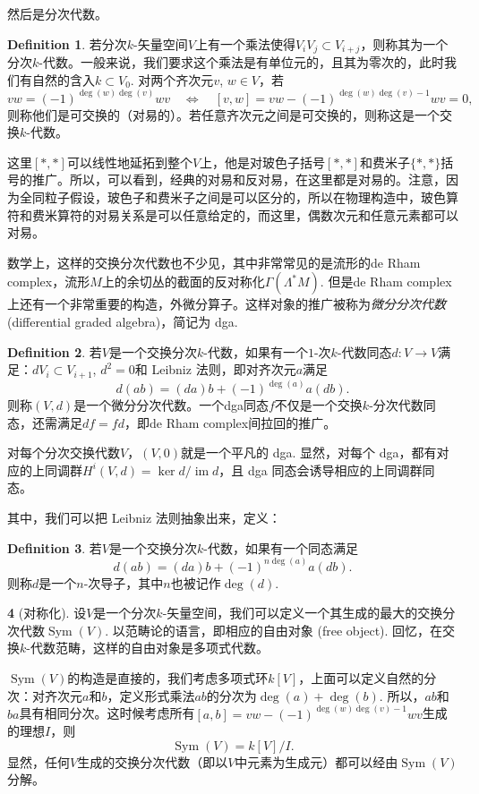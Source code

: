 \documentclass[11pt]{article}
\theoremstyle{definition}
\newtheorem{para}{}[section]
\newtheorem{defi}[para]{Definition}
\theoremstyle{plain}
\begin{document}
然后是分次代数。

\begin{defi}
    若分次$k$-矢量空间$V$上有一个乘法使得$V_iV_j\subset V_{i+j}$，则称其为一个分次$k$-代数。一般来说，我们要求这个乘法是有单位元的，且其为零次的，此时我们有自然的含入$k\subset V_0$. 对两个齐次元$v$, $w\in V$，若
\[
    vw=(-1)^{\deg(w)\deg(v)}wv\quad \Leftrightarrow \quad 
    [v,w]=vw-(-1)^{\deg(w)\deg(v)-1}wv=0,
\]
则称他们是可交换的（对易的）。若任意齐次元之间是可交换的，则称这是一个交换$k$-代数。
\end{defi}

这里$[*,*]$可以线性地延拓到整个$V$上，他是对玻色子括号$[*,*]$和费米子$\{*,*\}$括号的推广。所以，可以看到，经典的对易和反对易，在这里都是对易的。注意，因为全同粒子假设，玻色子和费米子之间是可以区分的，所以在物理构造中，玻色算符和费米算符的对易关系是可以任意给定的，而这里，偶数次元和任意元素都可以对易。

数学上，这样的交换分次代数也不少见，其中非常常见的是流形的de Rham complex，流形$M$上的余切丛的截面的反对称化$\Gamma(\Lambda^*M)$. 但是de Rham complex上还有一个非常重要的构造，外微分算子。这样对象的推广被称为\textit{微分分次代数} (differential graded algebra)，简记为 dga. 

\begin{defi}
    若$V$是一个交换分次$k$-代数，如果有一个$1$-次$k$-代数同态$d:V\to V$满足：$dV_i\subset V_{i+1}$, $d^2=0$和 Leibniz 法则，即对齐次元$a$满足
    \[
        d(ab)=(da)b+(-1)^{\deg(a)}a(db).
    \]
    则称$(V,d)$是一个微分分次代数。一个dga同态$f$不仅是一个交换$k$-分次代数同态，还需满足$df=fd$，即de Rham complex间拉回的推广。
\end{defi}

对每个分次交换代数$V$，$(V,0)$就是一个平凡的 dga. 
显然，对每个 dga，都有对应的上同调群$H^i(V,d)=\ker d/\operatorname{im} d$，且 dga 同态会诱导相应的上同调群同态。

其中，我们可以把 Leibniz 法则抽象出来，定义：
\begin{defi}
    若$V$是一个交换分次$k$-代数，如果有一个同态满足
    \[
        d(ab)=(da)b+(-1)^{n\deg(a)}a(db).
    \]
    则称$d$是一个$n$-次导子，其中$n$也被记作$\deg(d)$.
\end{defi}

\begin{para}[对称化]
    设$V$是一个分次$k$-矢量空间，我们可以定义一个其生成的最大的交换分次代数$\operatorname{Sym}(V)$. 以范畴论的语言，即相应的自由对象 (free object). 回忆，在交换$k$-代数范畴，这样的自由对象是多项式代数。

    $\operatorname{Sym}(V)$的构造是直接的，我们考虑多项式环$k[V]$，上面可以定义自然的分次：对齐次元$a$和$b$，定义形式乘法$ab$的分次为$\deg(a)+\deg(b)$. 所以，$ab$和$ba$具有相同分次。这时候考虑所有$[a,b]=vw-(-1)^{\deg(w)\deg(v)-1}wv$生成的理想$I$，则
    \[
        \operatorname{Sym}(V)=k[V]/I.
    \]
    显然，任何$V$生成的交换分次代数（即以$V$中元素为生成元）都可以经由$\operatorname{Sym}(V)$分解。
\end{para}
\end{document}
